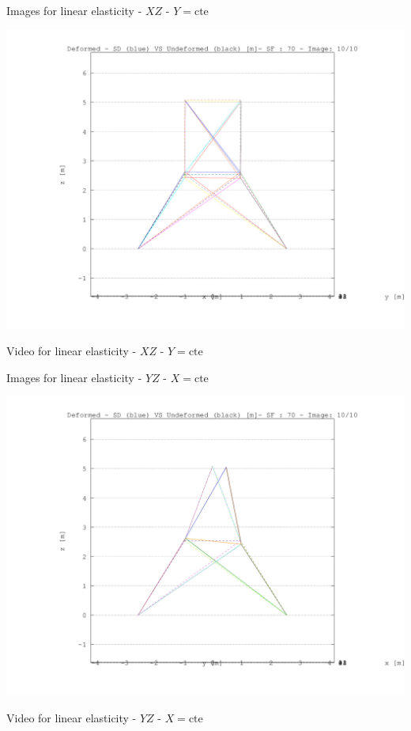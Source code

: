 \documentclass[a4paper,11pt]{article}
\begin{document}
\newpage       
\begin{center}       
Images for linear elasticity -  $XZ$ - $Y=\text{cte}$ 

\includegraphics[width=.80\textwidth]{../../XY_XZ_YZ/XZ/deformed/torre_deformed_XZ_10.png}      


Video for linear elasticity -  $XZ$ - $Y=\text{cte}$ 


\end{center}       
\newpage       
\begin{center}       
Images for linear elasticity -  $YZ$ - $X=\text{cte}$ 

\includegraphics[width=.80\textwidth]{../../XY_XZ_YZ/YZ/deformed/torre_deformed_YZ_10.png}      


Video for linear elasticity -  $YZ$ - $X=\text{cte}$ 


\end{center}       
\newpage       
\end{document}
